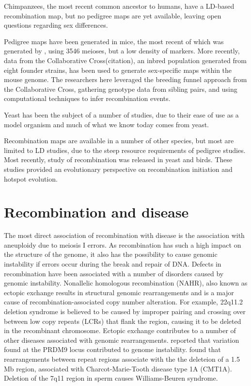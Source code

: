 Chimpanzees, the most recent common ancestor to humans, have a LD-based recombination map\cite{Auton2012a}, but no pedigree maps are yet available, leaving open questions regarding sex differences.

Pedigree maps have been generated in mice\cite{Broman2002}, the most recent of which 
was generated by \citet{Cox2009}, using 3546 meioses, but a low density of markers.
More recently, data from the Collaborative Cross(citation), an inbred population generated from eight founder strains, has been used to generate sex-specific maps within the mouse genome\cite{Liu2014}.
The researchers here leveraged the breeding funnel approach from the Collaborative Cross, gathering genotype data from sibling pairs, and using computational techniques to infer recombination events.


Yeast has been the subject of a number of studies, due to their ease of use as a model organism and much of what we know today comes from yeast.

Recombination maps are available in a number of other species, but most are limited to LD studies, due to the steep resource requirements of pedigree studies.
Most recently, study of recombination was released in yeast\cite{Lam2015} and birds\cite{Singhal2015}.
These studies provided an evolutionary perspective on recombination initiation and hotspot evolution.



\section{Recombination and disease}

The most direct association of recombination with disease is the association with aneuploidy due to meiosis I errors\cite{Hassold2001,Hassold2007}.
As recombination has such a high impact on the structure of the genome, it also has the possibility to cause genomic instability if errors occur during the break and repair of DNA.
Defects in recombination have been associated with a number of disorders caused by genomic instability.
Nonallelic homologous recombination (NAHR), also known as ectopic exchange results in structural genomic rearrangements and is a major cause of recombination-associated copy number alteration.
For example, 22q11.2 deletion syndrome is believed to be caused by improper pairing and crossing over between low copy repeats (LCRs) that flank the region, causing it to be deleted in the recombinant chromosome\cite{Emanuel2008}.
Ectopic exchange contributes to a number of other diseases associated with genomic rearrangements\cite{Stankiewicz2002,Liu2012}.
\citet{Berg2010} reported that variation found at the PRDM9 locus contributed to genome instability.
\citet{Pentao1992} found that rearrangements between repeat regions associate with the the deleteion of a 1.5 Mb region, associated with Charcot-Marie-Tooth disease type 1A (CMT1A).
Deletion of the 7q11 region in sperm causes Williams-Beuren syndrome\cite{Turner2008}.

